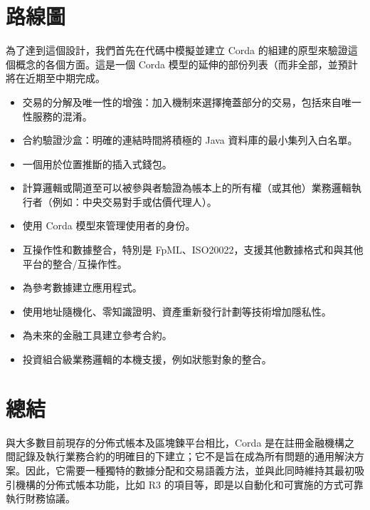 \documentclass[UTF8]{ctexart}
\begin{document}



\section{路線圖}
為了達到這個設計，我們首先在代碼中模擬並建立 Corda 的組建的原型來驗證這個概念的各個方面。這是一個 Corda 模型的延伸的部份列表（而非全部，並預計將在近期至中期完成。
\begin{itemize}	
\item 交易的分解及唯一性的增強：加入機制來選擇掩蓋部分的交易，包括來自唯一性服務的混淆。
\item 合約驗證沙盒：明確的連結時間將積極的 Java 資料庫的最小集列入白名單。
\item 一個用於位置推斷的插入式錢包。
\item 計算邏輯或閘道至可以被參與者驗證為帳本上的所有權（或其他）業務邏輯執行者（例如：中央交易對手或估價代理人）。
\item	使用 Corda 模型來管理使用者的身份。
\item 互操作性和數據整合，特別是 FpML、ISO20022，支援其他數據格式和與其他平台的整合/互操作性。
\item	為參考數據建立應用程式。
\item	使用地址隨機化、零知識證明、資產重新發行計劃等技術增加隱私性。
\item	為未來的金融工具建立參考合約。
\item 投資組合級業務邏輯的本機支援，例如狀態對象的整合。
\end{itemize}
\section{總結}
與大多數目前現存的分佈式帳本及區塊鍊平台相比，Corda 是在註冊金融機構之間記錄及執行業務合約的明確目的下建立；它不是旨在成為所有問題的通用解決方案。因此，它需要一種獨特的數據分配和交易語義方法，並與此同時維持其最初吸引機構的分佈式帳本功能，比如 R3 的項目等，即是以自動化和可實施的方式可靠執行財務協議。


\end{document}
